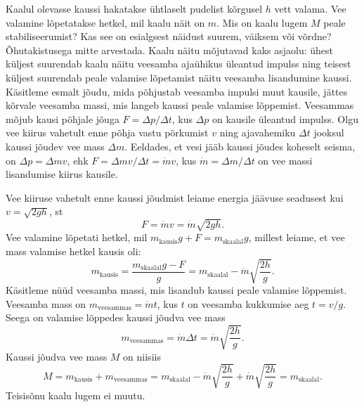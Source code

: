
Kaalul olevasse kaussi hakatakse ühtlaselt pudelist kõrgusel $h$ vett valama. Vee valamine lõpetatakse hetkel, mil kaalu näit on $m$. Mis on kaalu lugem $M$ peale stabiliseerumist? Kas see on esialgsest näidust suurem, väiksem või võrdne? Õhutakistusega mitte arvestada.\hint
Kaalu näitu mõjutavad kaks asjaolu: ühest küljest suurendab kaalu näitu veesamba ajaühikus üleantud impulss ning teisest küljest suurendab peale valamise lõpetamist näitu veesamba lisandumine kaussi.\solu
Käsitleme esmalt jõudu, mida põhjustab veesamba impulsi muut kausile, jättes kõrvale veesamba massi, mis langeb kaussi peale valamise lõppemist. Veesammas mõjub kausi põhjale jõuga $F=\Delta p / \Delta t$, kus $\Delta p$ on kausile üleantud impulss. Olgu vee kiirus vahetult enne põhja vastu põrkumist $v$ ning ajavahemiku $\Delta t$ jooksul kaussi jõudev vee mass $\Delta m$. Eeldades, et vesi jääb kaussi jõudes koheselt seisma, on $\Delta p = \Delta m v$, ehk $F=\Delta m v / \Delta t = \dot{m} v$, kus $\dot{m} = \Delta m / \Delta t$ on vee massi lisandumise kiirus kausile. 

Vee kiiruse vahetult enne kaussi jõudmist leiame energia jäävuse seadusest kui $v=\sqrt{2gh}$, st
\[
F=\dot mv = \dot m\sqrt{2gh}.
\]
Vee valamine lõpetati hetkel, mil $m_{\mathrm{kausis}} g+F=m_\mathrm{skaalal}g$, millest leiame, et vee mass valamise hetkel kausis oli:
\begin{equation*}
m_{\mathrm{kausis}}=\frac{m_{\mathrm{skaalal}} g-F}{g}=m_{\mathrm{skaalal}}-\dot{m}\sqrt{\frac{2h}{g}}.
\end{equation*}
Käsitleme nüüd veesamba massi, mis lisandub kaussi peale valamise lõppemist. Veesamba mass on $m_{\mathrm{veesammas}}=\dot{m}t$, kus $t$ on veesamba kukkumise aeg $t = v / g$. Seega on valamise lõppedes kaussi jõudva vee mass
\begin{equation*}
m_{\mathrm{veesammas}}=\dot{m} \Delta t = \dot{m}\sqrt{\frac{2h}{g}}.
\end{equation*}
Kaussi jõudva vee mass $M$ on niisiis
\begin{equation*}
M=m_{\mathrm{kausis}}+m_{\mathrm{veesammas}}=m_{\mathrm{skaalal}}-\dot{m}\sqrt{\frac{2h}{g}}+\dot{m}\sqrt{\frac{2h}{g}}=m_{\mathrm{skaalal}}.
\end{equation*}
Teisisõnu kaalu lugem ei muutu.\probend